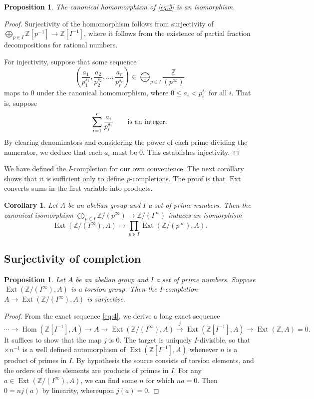 \documentclass[11pt, oneside, dvipsnames, svgnames, table, final]{amsart}
\newcommand{\mathbx}[1]{\mathbb{#1}}
\theoremstyle{plain}
\newtheorem{corollary}[thm]{Corollary}
\newtheorem{proposition}[thm]{Proposition}
\theoremstyle{definition}
\theoremstyle{remark}
\newcommand{\Z}{\mathbx{Z}}
\newcommand{\Ext}{\operatorname{Ext}}
\newcommand{\Hom}{\operatorname{Hom}}
\newcommand{\<}[1]{{\langle}#1 {\rangle}}
\newcommand{\Zpinf}{\Z/\left(p^\infty\right)}
\newcommand{\ZIinf}{\Z/\left(I^\infty\right)}
\begin{document}
\begin{proposition} \label{pr:canIsIso}
  The canonical homomorphism of \eqref{eq:5} is an isomorphism.
\end{proposition}
\begin{proof}
  Surjectivity of the homomorphism follows from surjectivity of $\bigoplus_{p \in I} \Z[p^{-1}] \to \Z[I^{-1}]$, where it follows from the existence of partial fraction decompositions for rational numbers.

  For injectivity, suppose that some sequence
  \[ \left( \frac{a_1}{p_1^{s_1}}, \frac{a_2}{p_2^{s_2}}, \dots , \frac{a_r}{p_r^{s_r}} \right) \in \bigoplus_{p \in I} \frac{\Z}{(p^\infty)} \]
  maps to $0$ under the canonical homomorphism, where $0 \le a_i < p_i^{s_i}$ for all $i$. That is, suppose
  \[ \sum_{i = 1}^r \frac{a_i}{p_i^{s_i}} \text{\qquad is an integer.} \]
  By clearing denominators and considering the power of each prime dividing the numerator, we deduce that each $a_i$ must be $0$. This establishes injectivity.
\end{proof}

We have defined the $I$-completion for our own convenience. The next corollary shows that it is sufficient only to define $p$-completions. The proof is that $\Ext$ converts sums in the first variable into products.
\begin{corollary}\label{cor:IcompletionIsProduct}
  Let $A$ be an abelian group and $I$ a set of prime numbers. Then the canonical isomorphism $\bigoplus_{p \in I} \Zpinf \to \ZIinf$ induces an isomorphism
  \[ \Ext(\ZIinf, A) \to \prod_{p \in I} \Ext(\Zpinf, A). \]
\end{corollary}


\subsection{Surjectivity of completion}
\label{sec:surj-compl}


\begin{proposition} \label{pr:surjectivityOfCompletion}
  Let $A$ be an abelian group and $I$ a set of prime numbers. Suppose $\Ext(\ZIinf, A)$ is a torsion group. Then the $I$-completion $A \to \Ext(\ZIinf, A)$ is surjective.
\end{proposition}
\begin{proof}
From the exact sequence \eqref{eq:4}, we derive a long exact sequence
    \begin{equation}
      \label{eq:6}
     \cdots \to \Hom(\Z[I^{-1}], A) \to A \to \Ext(\ZIinf, A) \overset{j}\to \Ext(\Z[I^{-1}], A) \to \Ext(\Z, A) = 0.
    \end{equation}
    It suffices to show that the map $j$ is $0$. The target is uniquely $I$-divisible, so that $\times n^{-1}$ is a well defined automorphism of $\Ext(\Z[I^{-1}], A)$ whenever $n$ is a product of primes in $I$. By hypothesis the source consists of torsion elements, and the orders of these elements are products of primes in $I$. For any $a \in \Ext(\ZIinf, A)$, we can find some $n$ for which $na=0$. Then $0 = nj(a)$ by linearity, whereupon $j(a)=0$.
\end{proof}
\end{document}
